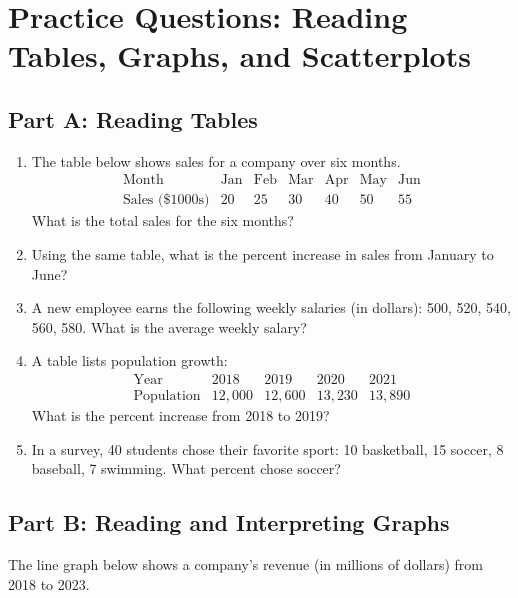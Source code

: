 \documentclass[14pt]{extarticle}
\begin{document}
\newpage


\section*{Practice Questions: Reading Tables, Graphs, and Scatterplots}

\subsection*{Part A: Reading Tables}
\begin{enumerate}
  \item The table below shows sales for a company over six months.  
  \[
  \begin{array}{c|cccccc}
  \text{Month} & \text{Jan} & \text{Feb} & \text{Mar} & \text{Apr} & \text{May} & \text{Jun}\\ \hline
  \text{Sales (\$1000s)} & 20 & 25 & 30 & 40 & 50 & 55
  \end{array}
  \]
  What is the total sales for the six months?

  \item Using the same table, what is the percent increase in sales from January to June?

  \item A new employee earns the following weekly salaries (in dollars): 500, 520, 540, 560, 580.  
  What is the average weekly salary?

  \item A table lists population growth:  
  \[
  \begin{array}{c|cccc}
  \text{Year} & 2018 & 2019 & 2020 & 2021\\ \hline
  \text{Population} & 12{,}000 & 12{,}600 & 13{,}230 & 13{,}890
  \end{array}
  \]
  What is the percent increase from 2018 to 2019?

  \item In a survey, 40 students chose their favorite sport: 10 basketball, 15 soccer, 8 baseball, 7 swimming.  
  What percent chose soccer?
\end{enumerate}

\subsection*{Part B: Reading and Interpreting Graphs}
The line graph below shows a company's revenue (in millions of dollars) from 2018 to 2023.
\end{document}
